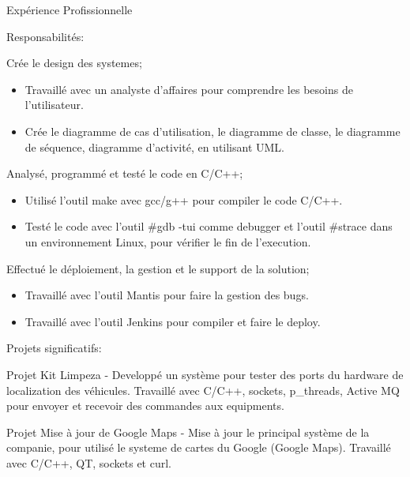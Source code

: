 \documentclass{resume}
\begin{document}
\begin{rSection}{Expérience Profissionnelle}
      \begin{rSubsection}{\fontsize{9}{10}\selectfont Responsabilités:}{}{}{}
        \item Crée le design des systemes;
          \begin{addmargin}[1em]{2em}
            \renewcommand\labelitemi{$\cdot$}
            \begin{itemize}
              \item Travaillé avec un analyste d'affaires pour comprendre les besoins de l'utilisateur.
              \item Crée le diagramme de cas d'utilisation, le diagramme de classe, le diagramme de séquence, diagramme d'activité, en utilisant UML.
            \end{itemize}
          \end{addmargin}
        \item Analysé, programmé et testé le code en C/C++;
            \begin{addmargin}[1em]{2em}
              \renewcommand\labelitemi{$\cdot$}
              \begin{itemize}
                \item Utilisé l'outil make avec gcc/g++ pour compiler le code C/C++.
                \item Testé le code avec l'outil \#gdb -tui comme debugger et l'outil \#strace dans un environnement Linux, pour vérifier le fin de l'execution. 
              \end{itemize}
            \end{addmargin}
        \item Effectué le déploiement, la gestion et le support de la solution;
            \begin{addmargin}[1em]{2em}
              \renewcommand\labelitemi{$\cdot$}
              \begin{itemize}
                \item Travaillé avec l'outil Mantis pour faire la gestion des bugs.
                \item Travaillé avec l'outil Jenkins pour compiler et faire le deploy.
              \end{itemize}
            \end{addmargin}        
      \end{rSubsection}

      \begin{rSubsection}{\fontsize{9}{10}\selectfont Projets significatifs:}{}{}{}
        \item Projet Kit Limpeza - Developpé un système pour tester des ports du hardware de localization des véhicules. Travaillé avec C/C++, sockets, p\_threads, Active MQ pour envoyer et recevoir des commandes aux equipments.
        \item Projet Mise à jour de Google Maps - Mise à jour le principal système de la companie, pour utilisé le systeme de cartes du Google (Google Maps). Travaillé avec C/C++, QT, sockets et curl.
      \end{rSubsection}


\end{rSection}
\end{document}
